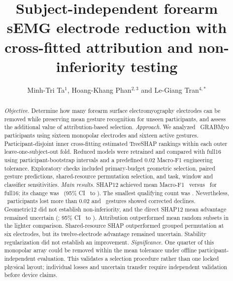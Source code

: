 \documentclass{iopjournal}
\begin{document}
\title{Subject-independent forearm sEMG electrode reduction with cross-fitted attribution and non-inferiority testing}
\author{Minh-Tri Ta$^1$, Hoang-Khang Phan$^{2,3}$ and Le-Giang Tran$^{4,*}$}







\begin{abstract}
\textit{Objective.} Determine how many forearm surface electromyography electrodes can be removed while preserving mean gesture recognition for unseen participants, and assess the additional value of attribution-based selection.
\textit{Approach.} We analyzed \GRABMyoParticipants\ GRABMyo participants using sixteen monopolar electrodes and sixteen active gestures. Participant-disjoint inner cross-fitting estimated TreeSHAP rankings within each outer leave-one-subject-out fold. Reduced models were retrained and compared with full16 using participant-bootstrap intervals and a predefined 0.02 Macro-F1 engineering tolerance. Exploratory checks included primary-budget geometric selection, paired gesture predictions, shared-resource permutation selection, and task, window and classifier sensitivities.
\textit{Main results.} SHAP12 achieved mean Macro-F1 \RevShapMean\ versus \RevPrimaryFull\ for full16; its change was \RevShapDelta\ (95\% CI \RevShapLow\ to \RevShapHigh). The smallest qualifying count was \KStarMarginPtTwo. Nevertheless, \RevLossCount\ participants lost more than 0.02 and \RevGestureLossCount\ gestures showed corrected declines. Geometric12 did not establish non-inferiority, and the direct SHAP12 mean advantage remained uncertain (\RevGeomContrast; 95\% CI \RevGeomContrastLow\ to \RevGeomContrastHigh). Attribution outperformed mean random subsets in the lighter comparison. Shared-resource SHAP outperformed grouped permutation at six electrodes, but its twelve-electrode advantage remained uncertain. Stability regularization did not establish an improvement.
\textit{Significance.} One quarter of this monopolar array could be removed within the mean tolerance under offline participant-independent evaluation. This validates a selection procedure rather than one locked physical layout; individual losses and uncertain transfer require independent validation before device claims.
\end{abstract}
\end{document}

